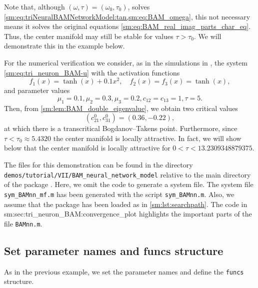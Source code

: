 \begin{remark}
    Note that, although $(\omega,\tau) = (\omega_0,\tau_0)$, solves \cref{sm:eq:triNeuralBAMNetworkModel:tan,sm:eq:BAM_omega},
    this not necessary means it solves the original equations \cref{sm:eq:BAM_real_imag_parts_char_eq}.
    Thus, the center manifold may still be stable for values $\tau>\tau_0$. We will demonstrate this
    in the example below.
\end{remark}

For the numerical verification we consider, as in the simulations in
\cite[Example 1]{dong2013bogdanov}, the system \cref{sm:eq:tri_neuron_BAM-u} with
the activation functions
\begin{equation}
    \label{sm:eq:triNeuralBAMNetworkModelFunctions}
    f_{1}(x)=\tanh(x)+0.1x^{2},\quad f_{2}(x)=f_{3}(x)=\tanh(x),
\end{equation}
and parameter values
\begin{equation}
    \label{sm:eq:triNeuralBAMNetworkModelFixedParameters}
    \mu_{1}=0.1,\mu_{2}=0.3,\mu_{3}=0.2,c_{12}=c_{13}=1,\tau=5.
\end{equation}
Then, from \cref{sm:lem:BAM_double_eigenvalue}, we obtain two critical
values 
\[
(c_{21}^{0},c_{31}^{0})=(0.36,-0.22),
\]
at which there is a transcritical Bogdanov--Takens point. Furthermore, since
$\tau < \tau_0 \approx 5.4320$ the center manifold is locally attractive. In
fact, we will show below that the center manifold is locally attractive for
$0<\tau<13.2309348879375$.

\begin{remark}
    The \MATLAB files for this demonstration can be found in the directory
    \texttt{demos/tutorial/VII/BAM_neural_network_model} relative to the main
    directory of the package \DDEBIFTOOL. Here, we omit the code to generate a
    system file. The system file\\
    \texttt{sym_BAMnn_mf.m} has been
    generated with the script \texttt{sym_BAMnn.m}. Also, we assume
    that the \DDEBIFTOOL package has been loaded as in
    \cref{sm:lst:searchpath}. The code in
              {sm:sec:tri_neuron_BAM:convergence_plot}
    highlights the important parts of the file
    \texttt{BAMnn.m}. 
\end{remark}

\subsection{Set parameter names and funcs structure} 
\label{sm:sec:tri_neuron_BAM:pars_and_funcs}
As in the previous example, we set the parameter names and define the \texttt{funcs} structure.
\inputminted[firstline=27, lastline=33]{MATLAB}{\pathToDDEBifToolDemos/BAM_neural_network_model/BAMnn.m}


